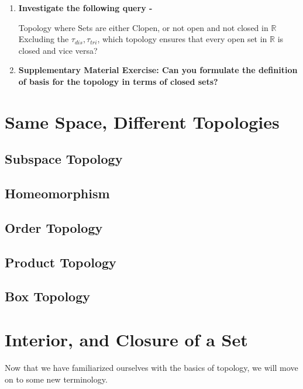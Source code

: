 \begin{enumerate}[label=\textbf{\arabic*.}]
\begin{Query}{Union of Topologies}
        {[Hint: (I) Think of some of the topologies from the set $X=\{a,b,c\}$. (II) You have two bags but can only carry one. But you want to keep both bags, so what would you do in that case? You simply put the smaller bag into the larger one!]}
    \end{Query}
    \item \textbf{Investigate the following query -}
    \begin{Query}{Topology where Sets are either Clopen, or not open and not closed in $\mathbb{R}$}\label{partition_topology_real}
        Excluding the $\tau_{dis}, \tau_{tri}$, which topology ensures that every open set in $\mathbb{R}$ is closed and vice versa?
    \end{Query}
    \item \textbf{Supplementary Material Exercise: Can you formulate the definition of basis for the topology in terms of closed sets?}
\end{enumerate}
\section{Same Space, Different Topologies}
\subsection{Subspace Topology}
\subsection{Homeomorphism}
\subsection{Order Topology}
\subsection{Product Topology}
\subsection{Box Topology}
\section{Interior, and Closure of a Set}
Now that we have familiarized ourselves with the basics of topology, we will move on to some new terminology.
